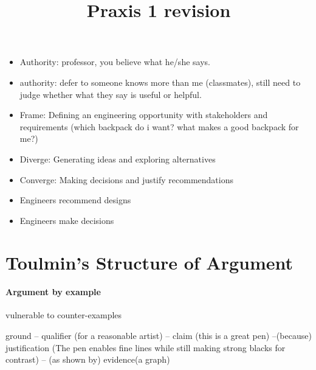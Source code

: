 \documentclass[12pt]{article}
\title{ Praxis 1 revision}
\begin{document}
\maketitle

\begin{itemize}

\item Authority: professor, you believe what he/she says.
\item authority: defer to someone knows more than me (classmates), still need to judge whether what they say is useful or helpful.
\item Frame: Defining an engineering opportunity with stakeholders and requirements (which backpack do i want? what makes a good backpack for me?)
\item Diverge: Generating ideas and exploring alternatives
\item Converge: Making decisions and justify recommendations
\item Engineers recommend designs
\item Engineers make decisions

\end{itemize}

\section{Toulmin's Structure of Argument}

\paragraph{Argument by example}

vulnerable to counter-examples

ground -- qualifier (for a reasonable artist) -- claim (this is a great pen) --(because) justification (The pen enables fine lines while still making strong blacks for contrast) -- (as shown by) evidence(a graph)
\end{document}
